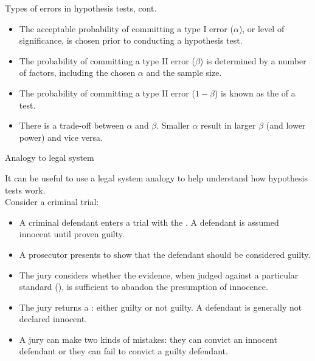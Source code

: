 \documentclass[xcolor=table, handout]{beamer}
\begin{document}
\begin{frame}{Types of errors in hypothesis tests, cont.}
\begin{block}{}
\large
\begin{itemize}
\item The acceptable probability of committing a type I error ($\alpha$), or level of significance,  is chosen prior to conducting a hypothesis test.
\pause\item The probability of committing a type II error ($\beta$) is determined by a number of factors, including the chosen $\alpha$ and the sample size.
\pause\item The probability of  committing a type II error ($1-\beta$) is known as the  of a test.
\pause\item There is a trade-off between $\alpha$ and $\beta$. Smaller $\alpha$ result in larger $\beta$ (and lower power) and vice versa.
\end{itemize}
\end{block}
\end{frame}

\begin{frame}{Analogy to legal system}
\begin{block}{}
\large
It can be useful to use a legal system analogy to help understand how hypothesis tests work.\\
\medskip
Consider a criminal trial:
\begin{itemize}
\pause\item A criminal defendant enters a trial with the . A defendant is assumed innocent until proven guilty.
\pause\item A prosecutor presents  to show that the defendant should be considered guilty.
\pause\item The jury considers whether the evidence, when judged against a particular standard (), is sufficient to abandon the presumption of innocence.
\pause\item The jury returns a : either guilty or not guilty. A defendant is generally not declared innocent.   
\pause\item A jury can make two kinds of mistakes: they can convict an innocent defendant or they can fail to convict a guilty defendant.
\end{itemize}
\end{block}
\end{frame}
\end{document}
